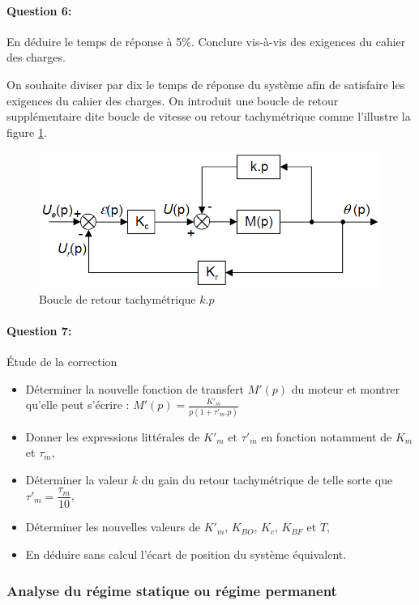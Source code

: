 \paragraph{Question 6:} En déduire le temps de réponse à 5\%. Conclure vis-à-vis des exigences du
cahier des charges.

On souhaite diviser par dix le temps de réponse du système afin de satisfaire les exigences du cahier des charges. On introduit une boucle de retour supplémentaire dite boucle de vitesse ou retour tachymétrique comme l'illustre la figure \ref{fig24}.

\begin{figure}[!h]
\centering\includegraphics[width=0.5\linewidth]{img/Tracteur24.png}
\caption{Boucle de retour tachymétrique $k.p$}
\label{fig24}
\end{figure}

\paragraph{Question 7:} Étude de la correction

\begin{itemize}
 \item Déterminer la nouvelle fonction de transfert $M'(p)$ du moteur et montrer qu'elle peut s'écrire : $M'(p)=\frac{K'_m}{p(1+\tau'_m.p)}$

 \item Donner les expressions littérales de $K'_m$ et $\tau'_m$ en fonction notamment de $K_m$ et $\tau_m$,
 \item Déterminer la valeur $k$ du gain du retour tachymétrique de telle sorte que $\tau'_m=\dfrac{\tau_m}{10}$,
 \item Déterminer les nouvelles valeurs de $K'_m$, $K_{BO}$, $K_c$, $K_{BF}$ et $T$,
 \item En déduire sans calcul l'écart de position du système équivalent.
\end{itemize}

\subsubsection{Analyse du régime statique ou régime permanent}

